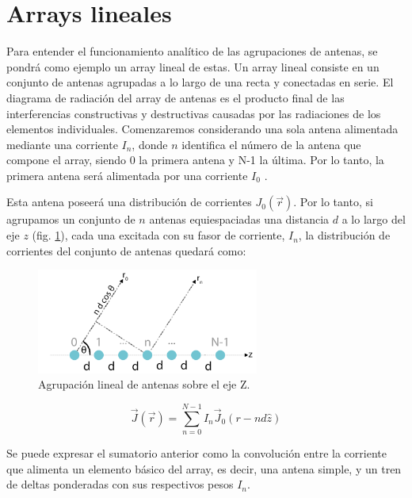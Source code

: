 \section{Arrays lineales}
\par Para entender el funcionamiento analítico de las agrupaciones de antenas, se pondrá como ejemplo un array lineal de estas. Un array lineal consiste en un conjunto de antenas agrupadas a lo largo de una recta y conectadas en serie. El diagrama de radiación del array de antenas es el producto final de las interferencias constructivas y destructivas causadas por las radiaciones de los elementos individuales. Comenzaremos considerando una sola antena alimentada mediante una corriente $I_{n}$, donde $n$ identifica el número de la antena que compone el array, siendo 0 la primera antena y N-1 la última. Por lo tanto, la primera antena será alimentada por una corriente $I_{0}$ \citep{Cardama2002}.
\\
\par Esta antena poseerá una distribución de corrientes $J_{0}(\vec{r})$. Por lo tanto, si agrupamos un conjunto de $n$ antenas equiespaciadas una distancia $d$ a lo largo del eje $z$ (fig. \ref{fig:arraigo}), cada una excitada con su fasor de corriente, $I_{n}$, la distribución de corrientes del conjunto de antenas quedará como:

\begin{figure}[h]
    \centering
        \includegraphics[width=0.65\textwidth]{archivos/array/array}
        \caption{Agrupación lineal de antenas sobre el eje Z.}
        \label{fig:arraigo}
\end{figure}

\begin{equation}
	\vec{J}\left ( \vec{r} \right )=\sum_{n=0}^{N-1}I_{n}\vec{J}_{0}(r-nd\hat{z})
	\label{eq:distrib}
\end{equation}

\par Se puede expresar el sumatorio anterior como la convolución entre la corriente que alimenta un elemento básico del array, es decir, una antena simple, y un tren de deltas ponderadas con sus respectivos pesos $I_{n}$.

